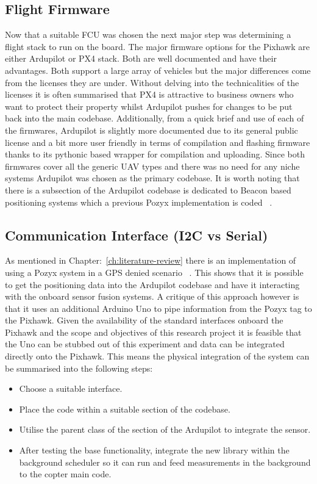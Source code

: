 \subsection{Flight Firmware}\label{subsec:flight-firmware}
Now that a suitable FCU was chosen the next major step was determining a flight stack to run on the board.
The major firmware options for the Pixhawk are either Ardupilot or PX4 stack.
Both are well documented and have their advantages.
Both support a large array of vehicles but the major differences come from the licenses they are under.
Without delving into the technicalities of the licenses it is often summarised that PX4 is attractive to business owners who want to protect their property whilst Ardupilot pushes for changes to be put back into the main codebase.
Additionally, from a quick brief and use of each of the firmwares, Ardupilot is slightly more documented due to its general public license and a bit more user friendly in terms of compilation and flashing firmware thanks to its pythonic based wrapper for compilation and uploading.
Since both firmwares cover all the generic UAV types and there was no need for any niche systems Ardupilot was chosen as the primary codebase.
It is worth noting that there is a subsection of the Ardupilot codebase is dedicated to Beacon based positioning systems which a previous Pozyx implementation is coded ~\cite{ardupilotarduino}.

\subsection{Communication Interface (I2C vs Serial)}\label{subsec:communication-interfacei2c-vs-serial}
As mentioned in Chapter:~\ref{ch:literature-review} there is an implementation of using a Pozyx system in a GPS denied scenario ~\cite{ardupilotarduino}.
This shows that it is possible to get the positioning data into the Ardupilot codebase and have it interacting with the onboard sensor fusion systems.
A critique of this approach however is that it uses an additional Arduino Uno to pipe information from the Pozyx tag to the Pixhawk.
Given the availability of the standard interfaces onboard the Pixhawk and the scope and objectives of this research project it is feasible that the Uno can be stubbed out of this experiment and data can be integrated directly onto the Pixhawk.
This means the physical integration of the system can be summarised into the following steps:
\begin{itemize}
    \item Choose a suitable interface.
    \item Place the code within a suitable section of the codebase.
    \item Utilise the parent class of the section of the Ardupilot to integrate the sensor.
    \item After testing the base functionality, integrate the new library within the background scheduler so it can run and feed measurements in the background to the copter main code.
\end{itemize}

